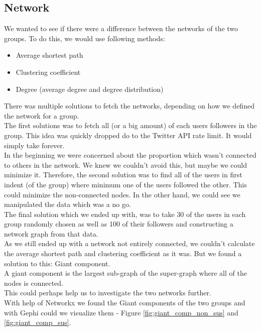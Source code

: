 \documentclass[10pt]{IEEEtran}
\begin{document}
\subsection{Network}
We wanted to see if there were a difference between the networks of the two groups. To do this, we would use following methods:\\
\begin{itemize}
  \item Average shortest path
  \item Clustering coefficient 
  \item Degree (average degree and degree distribution) \\
\end{itemize}
 There was multiple solutions to fetch the networks, depending on how we defined the network for a group. \\
The first solutions was to fetch all (or a big amount) of each users followers in the group. This idea was quickly dropped do to the Twitter API rate limit. It would simply take forever. \\
In the beginning we were concerned about the proportion which wasn't connected to others in the network. We knew we couldn't avoid this, but maybe we could minimize it. Therefore, the second solution was to find all of the users in first indent (of the group) where minimum one of the users followed the other. This could minimize the non-connected nodes. In the other hand, we could see we manipulated the data which was a no go. \\
The final solution which we ended up with, was to take 30 of the users in each group randomly chosen as well as 100 of their followers and constructing a network graph from that data. \\

As we still ended up with a network not entirely connected, we couldn't calculate the average shortest path and clustering coefficient as it was. But we found a solution to this: Giant component. \\
A giant component is the largest sub-graph of the super-graph where all of the nodes is connected. \\
This could perhaps help us to investigate the two networks further. \\

With help of Networkx\cite{networkx} we found the Giant components of the two groups and with Gephi\cite{gephi} could we visualize them - Figure \ref{fig:giant_comp_non_sus} and \ref{fig:giant_comp_sus}.
\end{document}
